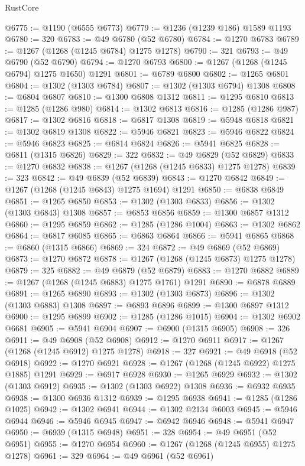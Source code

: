 \begin{lexlean}{RustCore}
\begin{coremodule}
@6775 := @1190 (@6555 @6773)
@6779 := @1236 (@1239 @186) @1589 @1193
@6780 := 320
@6783 := @49 @6780 (@52 @6780)
@6784 := @1270 @6783
@6789 := @1267 (@1268 (@1245 @6784) @1275 @1278)
@6790 := 321
@6793 := @49 @6790 (@52 @6790)
@6794 := @1270 @6793
@6800 := @1267 (@1268 (@1245 @6794) @1275 @1650) @1291
@6801 := @6789 @6800
@6802 := @1265 @6801
@6804 := @1302 (@1303 @6784)
@6807 := @1302 (@1303 @6794) @1308
@6808 := @6804 @6807
@6810 := @1300 @6808 @1312
@6811 := @1295 @6810
@6813 := @1285 (@1286 @980)
@6814 := @1302 @6813
@6816 := @1285 (@1286 @987)
@6817 := @1302 @6816
@6818 := @6817 @1308
@6819 := @5948 @6818
@6821 := @1302 @6819 @1308
@6822 := @5946 @6821
@6823 := @5946 @6822
@6824 := @5946 @6823
@6825 := @6814 @6824
@6826 := @5941 @6825
@6828 := @6811 (@1315 @6826)
@6829 := 322
@6832 := @49 @6829 (@52 @6829)
@6833 := @1270 @6832
@6838 := @1267 (@1268 (@1245 @6833) @1275 @1278)
@6839 := 323
@6842 := @49 @6839 (@52 @6839)
@6843 := @1270 @6842
@6849 := @1267 (@1268 (@1245 @6843) @1275 @1694) @1291
@6850 := @6838 @6849
@6851 := @1265 @6850
@6853 := @1302 (@1303 @6833)
@6856 := @1302 (@1303 @6843) @1308
@6857 := @6853 @6856
@6859 := @1300 @6857 @1312
@6860 := @1295 @6859
@6862 := @1285 (@1286 @1004)
@6863 := @1302 @6862
@6864 := @6817 @6085
@6865 := @6863 @6864
@6866 := @5941 @6865
@6868 := @6860 (@1315 @6866)
@6869 := 324
@6872 := @49 @6869 (@52 @6869)
@6873 := @1270 @6872
@6878 := @1267 (@1268 (@1245 @6873) @1275 @1278)
@6879 := 325
@6882 := @49 @6879 (@52 @6879)
@6883 := @1270 @6882
@6889 := @1267 (@1268 (@1245 @6883) @1275 @1761) @1291
@6890 := @6878 @6889
@6891 := @1265 @6890
@6893 := @1302 (@1303 @6873)
@6896 := @1302 (@1303 @6883) @1308
@6897 := @6893 @6896
@6899 := @1300 @6897 @1312
@6900 := @1295 @6899
@6902 := @1285 (@1286 @1015)
@6904 := @1302 @6902 @6681
@6905 := @5941 @6904
@6907 := @6900 (@1315 @6905)
@6908 := 326
@6911 := @49 @6908 (@52 @6908)
@6912 := @1270 @6911
@6917 := @1267 (@1268 (@1245 @6912) @1275 @1278)
@6918 := 327
@6921 := @49 @6918 (@52 @6918)
@6922 := @1270 @6921
@6928 := @1267 (@1268 (@1245 @6922) @1275 @1885) @1291
@6929 := @6917 @6928
@6930 := @1265 @6929
@6932 := @1302 (@1303 @6912)
@6935 := @1302 (@1303 @6922) @1308
@6936 := @6932 @6935
@6938 := @1300 @6936 @1312
@6939 := @1295 @6938
@6941 := @1285 (@1286 @1025)
@6942 := @1302 @6941
@6944 := @1302 @2134 @6003
@6945 := @5946 @6944
@6946 := @5946 @6945
@6947 := @6942 @6946
@6948 := @5941 @6947
@6950 := @6939 (@1315 @6948)
@6951 := 328
@6954 := @49 @6951 (@52 @6951)
@6955 := @1270 @6954
@6960 := @1267 (@1268 (@1245 @6955) @1275 @1278)
@6961 := 329
@6964 := @49 @6961 (@52 @6961)

\end{coremodule}
\end{lexlean}
